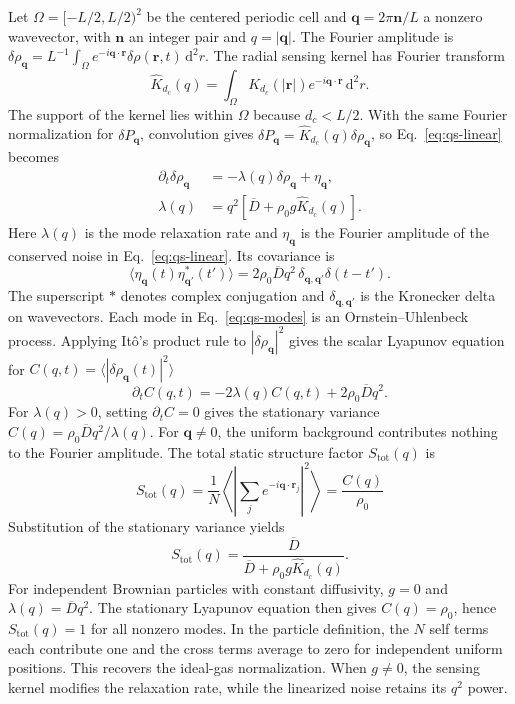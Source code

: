 \documentclass[aps,prl,reprint,letterpaper]{revtex4-2}
\begin{document}
Let \(\Omega=[-L/2,L/2)^2\) be the centered periodic cell and \(\mathbf q=2\pi\mathbf n/L\) a nonzero wavevector, with \(\mathbf n\) an integer pair and \(q=|\mathbf q|\). The Fourier amplitude is \(\delta\rho_{\mathbf q} = L^{-1}\int_\Omega e^{-i\mathbf q\cdot\mathbf r} \delta\rho(\mathbf r,t)\,\mathrm{d}^2r\). The radial sensing kernel has Fourier transform
\[
    \widehat K_{d_c}(q)
    =\int_\Omega K_{d_c}(|\mathbf r|)
        e^{-i\mathbf q\cdot\mathbf r}\,\mathrm{d}^2r .
\]
The support of the kernel lies within \(\Omega\) because \(d_c<L/2\). With the same Fourier normalization for \(\delta P_{\mathbf q}\), convolution gives \(\delta P_{\mathbf q}=\widehat K_{d_c}(q)\delta\rho_{\mathbf q}\), so Eq.~\eqref{eq:qs-linear} becomes
\begin{equation}
    \begin{aligned}
    \partial_t\delta\rho_{\mathbf q}
    &=-\lambda(q)\delta\rho_{\mathbf q}+\eta_{\mathbf q},\\
    \lambda(q)&=q^2[\overline D+\rho_0 g\widehat K_{d_c}(q)] .
    \end{aligned}
    \label{eq:qs-modes}
\end{equation}
Here \(\lambda(q)\) is the mode relaxation rate and \(\eta_{\mathbf q}\) is the Fourier amplitude of the conserved noise in Eq.~\eqref{eq:qs-linear}. Its covariance is
\begin{equation}
 \langle\eta_{\mathbf q}(t)\eta_{\mathbf q'}^*(t')\rangle
 =2\rho_0\overline D q^2\,\delta_{\mathbf q,\mathbf q'}\delta(t-t').
 \label{eq:qs-noise}
\end{equation}
The superscript \(*\) denotes complex conjugation and \(\delta_{\mathbf q,\mathbf q'}\) is the Kronecker delta on wavevectors. Each mode in Eq.~\eqref{eq:qs-modes} is an Ornstein--Uhlenbeck process. Applying It\^{o}'s product rule to \(|\delta\rho_{\mathbf q}|^2\) gives the scalar Lyapunov equation for \(C(q,t)=\langle|\delta\rho_{\mathbf q}(t)|^2\rangle\)
\[
 \partial_t C(q,t)=-2\lambda(q)C(q,t)+2\rho_0\overline Dq^2 .
\]
For \(\lambda(q)>0\), setting \(\partial_t C=0\) gives the stationary variance \(C(q)=\rho_0\overline Dq^2/\lambda(q)\). For \(\mathbf q\ne 0\), the uniform background contributes nothing to the Fourier amplitude. The total static structure factor \(S_{\mathrm{tot}}(q)\) is
\[
 S_{\mathrm{tot}}(q)=\frac{1}{N}
 \left\langle\left|\sum_j e^{-i\mathbf q\cdot\mathbf r_j}\right|^2
 \right\rangle=\frac{C(q)}{\rho_0}
\]
Substitution of the stationary variance yields
\begin{equation}
 S_{\mathrm{tot}}(q)=
 \frac{\overline D}{\overline D+\rho_0g\widehat K_{d_c}(q)} .
 \label{eq:qs-spectrum}
\end{equation}
For independent Brownian particles with constant diffusivity, \(g=0\) and \(\lambda(q)=\overline Dq^2\). The stationary Lyapunov equation then gives \(C(q)=\rho_0\), hence \(S_{\mathrm{tot}}(q)=1\) for all nonzero modes. In the particle definition, the \(N\) self terms each contribute one and the cross terms average to zero for independent uniform positions. This recovers the ideal-gas normalization.
When \(g\ne0\), the sensing kernel modifies the relaxation rate, while the linearized noise retains its \(q^2\) power.
\end{document}
